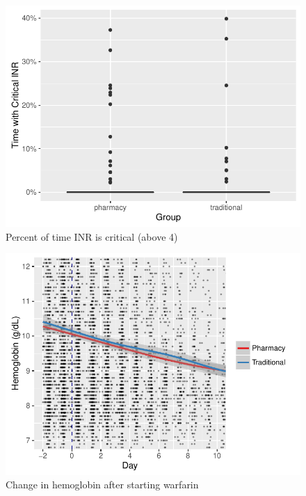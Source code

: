 \documentclass[]{article}
\begin{document}
\begin{figure}[H]
\centering
\includegraphics{warfarin_analysis_ASHP_files/figure-latex/time_above4-1.pdf}
\caption{Percent of time INR is critical (above 4)}
\end{figure}

\begin{figure}[H]
\centering
\includegraphics{warfarin_analysis_ASHP_files/figure-latex/hgb-1.pdf}
\caption{Change in hemoglobin after starting warfarin}
\end{figure}
\end{document}

